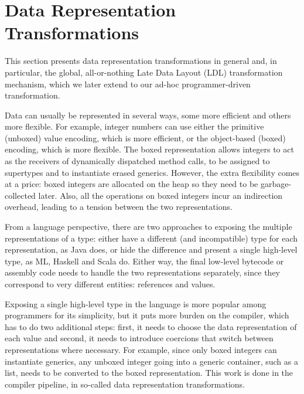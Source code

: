\section{Data Representation Transformations}
\label{sec:drt}

This section presents data representation transformations in general and, in particular, the global, all-or-nothing Late Data Layout (LDL) transformation mechanism, which we later extend to our ad-hoc programmer-driven transformation.

Data can usually be represented in several ways, some more efficient and others more flexible. For example, integer numbers can use either the primitive (unboxed) value encoding, which is more efficient, or the object-based (boxed) encoding, which is more flexible. The boxed representation allows integers to act as the receivers of dynamically dispatched method calls, to be assigned to supertypes and to instantiate erased generics. However, the extra flexibility comes at a price: boxed integers are allocated on the heap so they need to be garbage-collected later. Also, all the operations on boxed integers incur an indirection overhead, leading to a tension between the two representations.

From a language perspective, there are two approaches to exposing the multiple representations of a type: either have a different (and incompatible) type for each representation, as Java does, or hide the difference and present a single high-level type, as ML, Haskell and Scala do. Either way, the final low-level bytecode or assembly code needs to handle the two representations separately, since they correspond to very different entities: references and values.

Exposing a single high-level type in the language is more popular among programmers for its simplicity, but it puts more burden on the compiler, which has to do two additional steps: first, it needs to choose the data representation of each value and second, it needs to introduce coercions that switch between representations where necessary. For example, since only boxed integers can instantiate generics, any unboxed integer going into a generic container, such as a list, needs to be converted to the boxed representation. This work is done in the compiler pipeline, in so-called data representation transformations.

